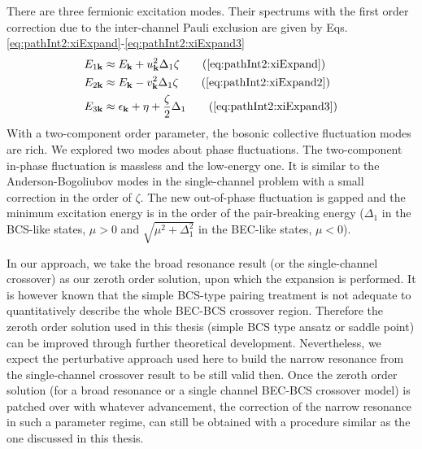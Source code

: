 There are three fermionic excitation modes. Their spectrums with the first order correction due to the inter-channel Pauli exclusion are given by Eqs. \ref{eq:pathInt2:xiExpand}-\ref{eq:pathInt2:xiExpand3}
\begin{align}
E_{1\vk}&\approx{}E_{\vk}+u_{\vk}^{2}\Delta_{1}\zeta\tag{\ref{eq:pathInt2:xiExpand}}\\
E_{2\vk}&\approx{}E_{\vk}-v_{\vk}^{2}\Delta_{1}\zeta\tag{\ref{eq:pathInt2:xiExpand2}}\\
E_{3\vk}&\approx{}\epsilon_{\vk}+\eta+\frac{\zeta}{2}\Delta_{1}
\tag{\ref{eq:pathInt2:xiExpand3}}
\end{align}
With a two-component order parameter, the bosonic collective fluctuation modes are rich.  We explored two  modes about  phase fluctuations.  The two-component in-phase fluctuation is massless and the low-energy one.  It is similar to the Anderson-Bogoliubov modes in the single-channel problem with a small correction in the order of $\zeta$.  The new out-of-phase fluctuation is gapped and the minimum excitation energy is in the order of the pair-breaking energy ($\Delta_{1}$ in the BCS-like states, $\mu>0$ and $\sqrt{\mu^{2}+\Delta_{1}^{2}}$ in the BEC-like states, $\mu<0$).  

       In our approach, we take the broad resonance result (or the single-channel crossover) as our zeroth order solution, upon which the expansion is performed.  It is however known that the simple BCS-type pairing treatment is not adequate  to quantitatively describe the whole BEC-BCS crossover region.  Therefore the zeroth order solution used in this thesis (simple BCS type ansatz or saddle point) can be improved through further theoretical development.  Nevertheless, we expect the perturbative approach used here to build the narrow resonance from the single-channel crossover result to be still valid then.  Once the zeroth order solution (for a broad resonance or a single channel BEC-BCS crossover model) is patched over with whatever advancement, the correction of the narrow resonance in such a parameter regime, can still be obtained with a procedure similar as the one discussed in this thesis.  
       
